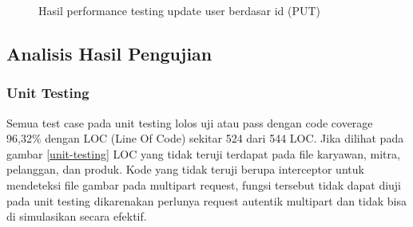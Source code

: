 \begin{figure}[H]
	{\par}
	\caption{Hasil performance testing update user berdasar id (PUT)}
	\label{update-user-testing}
\end{figure}

\newpage


\subsection{Analisis Hasil Pengujian}
\subsubsection{Unit Testing}
Semua test case pada unit testing lolos uji atau pass dengan code coverage 96,32\% dengan LOC (Line Of Code) sekitar 524 dari 544 LOC. Jika dilihat pada gambar \ref{unit-testing} LOC yang tidak teruji terdapat pada file karyawan, mitra, pelanggan, dan produk. Kode yang tidak teruji berupa interceptor untuk mendeteksi file gambar pada multipart request, fungsi tersebut tidak dapat diuji pada unit testing dikarenakan perlunya request autentik multipart dan tidak bisa di simulasikan secara efektif.

